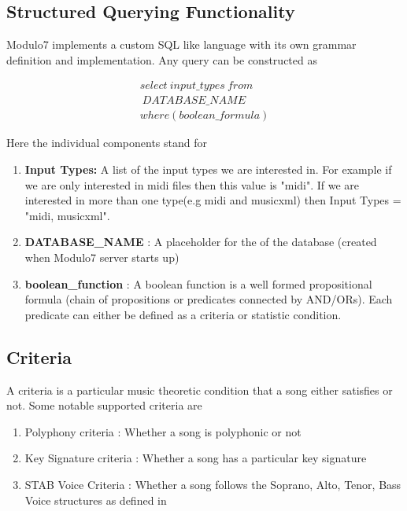 \documentclass{article}
\begin{document}
\subsection{Structured Querying Functionality} \label{structuredquery}

\noindent Modulo7 implements a custom SQL like language with its own grammar definition and implementation. Any query can be constructed as 

\begin{equation}
\begin{aligned}
select \ input\_types \ from \\\ DATABASE\_NAME \\ where (boolean\_formula)
\end{aligned}
\end{equation}

Here the individual components stand for 

\begin{enumerate}
\item \textbf{Input Types: } A list of the input types we are interested in. For example if we are only interested in midi files then this value is "midi". If we are interested in more than one type(e.g midi and musicxml) then Input Types = "midi, musicxml". 
\item \textbf{DATABASE\_NAME} : A placeholder for the of the database (created when Modulo7 server starts up)
\item \textbf{boolean\_function} : A boolean function is a well formed propositional formula (chain of propositions or predicates connected by AND/ORs). Each predicate can either be defined as a criteria or statistic condition.   
\end{enumerate}

\subsection{Criteria}

A criteria is a particular music theoretic condition that a song either satisfies or not. Some notable supported criteria are 

\begin{enumerate}
\item Polyphony criteria : Whether a song is polyphonic or not
\item Key Signature criteria : Whether a song has a particular key signature
\item STAB Voice Criteria : Whether a song follows the Soprano, Alto, Tenor, Bass Voice structures as defined in \cite{satbcriteria}
\end{enumerate}
\end{document}

